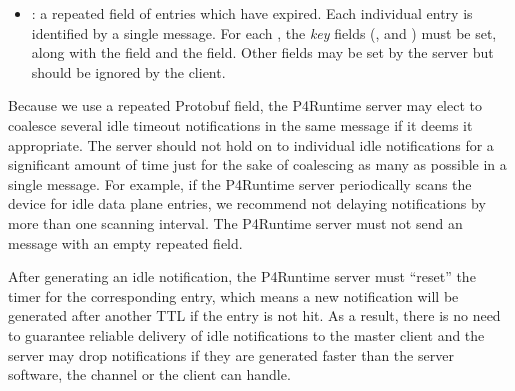 \documentclass[11pt]{article}
\begin{document}
{\begin{itemize}
\item{}
: a repeated field of entries which have expired. Each individual
entry is identified by a single  message. For each ,
the \emph{key} fields (,  and ) must be set, along with
the  field and the  field. Other fields
may be set by the server but should be ignored by the client.%
\end{itemize}%

\noindent{}Because we use a repeated Protobuf field, the P4Runtime server may elect to
coalesce several idle timeout notifications in the same
 message if it deems it appropriate. The server should
not hold on to individual idle notifications for a significant amount of time
just for the sake of coalescing as many as possible in a single message. For
example, if the P4Runtime server periodically scans the device for idle data
plane entries, we recommend not delaying notifications by more than one scanning
interval. The P4Runtime server must not send an 
message with an empty  repeated field.%

After generating an idle notification, the P4Runtime server must \textquotedblleft{}reset\textquotedblright{} the
timer for the corresponding entry, which means a new notification will be
generated after another TTL if the entry is not hit. As a result, there is no
need to guarantee reliable delivery of idle notifications to the master client
and the server may drop notifications if they are generated faster than the
server software, the channel or the client can handle.%

}
\end{document}
